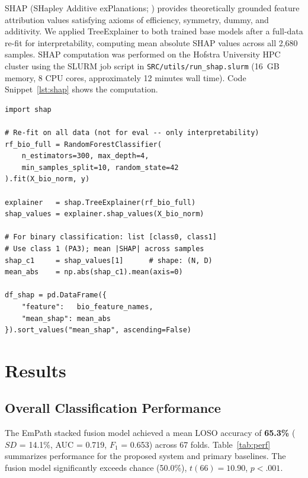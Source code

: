 \documentclass[10pt, twocolumn]{article}
\begin{document}
SHAP (SHapley Additive exPlanations; \cite{Lundberg2017}) provides theoretically grounded
feature attribution values satisfying axioms of efficiency, symmetry, dummy, and additivity.
We applied TreeExplainer to both trained base models after a full-data re-fit for
interpretability, computing mean absolute SHAP values across all 2,680 samples. SHAP
computation was performed on the Hofstra University HPC cluster using the SLURM job
script in \texttt{SRC/utils/run\_shap.slurm} (16~GB memory, 8 CPU cores, approximately
12 minutes wall time).
Code Snippet~\ref{lst:shap} shows the computation.

\begin{lstlisting}[caption={SHAP TreeExplainer applied to the biosignal Random Forest. The same procedure applies to the landmark RF.}, label={lst:shap}]
import shap

# Re-fit on all data (not for eval -- only interpretability)
rf_bio_full = RandomForestClassifier(
    n_estimators=300, max_depth=4,
    min_samples_split=10, random_state=42
).fit(X_bio_norm, y)

explainer   = shap.TreeExplainer(rf_bio_full)
shap_values = explainer.shap_values(X_bio_norm)

# For binary classification: list [class0, class1]
# Use class 1 (PA3); mean |SHAP| across samples
shap_c1     = shap_values[1]      # shape: (N, D)
mean_abs    = np.abs(shap_c1).mean(axis=0)

df_shap = pd.DataFrame({
    "feature":   bio_feature_names,
    "mean_shap": mean_abs
}).sort_values("mean_shap", ascending=False)
\end{lstlisting}

\FloatBarrier
\section{Results}
\label{sec:results}

\subsection{Overall Classification Performance}

The EmPath stacked fusion model achieved a mean LOSO accuracy of \textbf{65.3\%}
($SD$ = 14.1\%, AUC = 0.719, $F_1$ = 0.653) across 67 folds. Table~\ref{tab:perf}
summarizes performance for the proposed system and primary baselines. The fusion model
significantly exceeds chance (50.0\%), $t(66) = 10.90$, $p < .001$.
\end{document}
